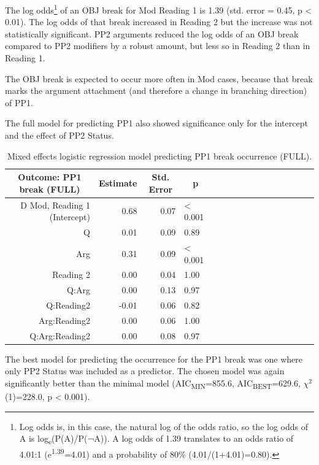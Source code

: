 \documentclass[12pt,oneside]{book}
\let\rmarkdownfootnote\footnote%
\def\footnote{\protect\rmarkdownfootnote}
\begin{document}
The log odds\footnote{Log odds is, in this case, the natural log of the odds ratio, so the log odds of A is log\textsubscript{e}(P(A)/P(¬A)). A log odds of 1.39 translates to an odds ratio of 4.01:1 (e\textsuperscript{1.39}=4.01) and a probability of 80\% (4.01/(1+4.01)=0.80).} of an OBJ break for Mod Reading 1 is 1.39 (std. error = 0.45, p \textless{} 0.01). The log odds of that break increased in Reading 2 but the increase was not statistically significant. PP2 arguments reduced the log odds of an OBJ break compared to PP2 modifiers by a robust amount, but less so in Reading 2 than in Reading 1.

The OBJ break is expected to occur more often in Mod cases, because that break marks the argument attachment (and therefore a change in branching direction) of PP1.

The full model for predicting PP1 also showed significance only for the intercept and the effect of PP2 Status.

\begin{table}[!h]

\caption{\label{tab:fullpp1Mod}Mixed effects logistic regression model predicting PP1 break occurrence (FULL).}
\centering
\begin{tabular}{rrrlrrrlrrrlrrrl}
\toprule
\multicolumn{1}{c}{Outcome: PP1 break (FULL)} & \multicolumn{1}{c}{Estimate} & \multicolumn{1}{c}{Std. Error} & \multicolumn{1}{c}{p}\\
\midrule
D Mod, Reading 1 (Intercept) & 0.68 & 0.07 & < 0.001\\
Q & 0.01 & 0.09 & 0.89\\
Arg & 0.31 & 0.09 & < 0.001\\
Reading 2 & 0.00 & 0.04 & 1.00\\
Q:Arg & 0.00 & 0.13 & 0.97\\
\addlinespace
Q:Reading2 & -0.01 & 0.06 & 0.82\\
Arg:Reading2 & 0.00 & 0.06 & 1.00\\
Q:Arg:Reading2 & 0.00 & 0.08 & 0.97\\
\bottomrule
\end{tabular}
\end{table}

The best model for predicting the occurrence for the PP1 break was one where only PP2 Status was included as a predictor. The chosen model was again significantly better than the minimal model (AIC\textsubscript{MIN}=855.6, AIC\textsubscript{BEST}=629.6, \(\chi^2\)(1)=228.0, p \textless{} 0.001).
\end{document}

